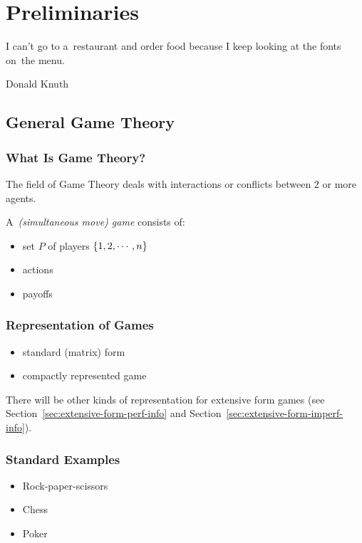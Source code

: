 \chapter{Preliminaries}
\epigraph{
  I can't go to a~restaurant and order food because I keep looking at the fonts on~the menu.
}{Donald Knuth}

\section{General Game Theory}

\subsection{What Is Game Theory?}

The field of Game Theory deals with interactions or conflicts between $2$ or more agents.
\todo

A~\emph{(simultaneous move) game} consists of: \todo
\begin{itemize}
  \item set $P$ of players $\left\{ 1, 2, \cdots, n \right\}$
  \item actions
  \item payoffs
\end{itemize}

\subsection{Representation of Games}

\todo
\begin{itemize}
  \item standard (matrix) form
  \item compactly represented game
\end{itemize}

There will be other kinds of representation for extensive form games (see Section~\ref{sec:extensive-form-perf-info} and Section~\ref{sec:extensive-form-imperf-info}).

\subsection{Standard Examples}

\todo %

\begin{itemize}
  \item{Rock-paper-scissors}
  \item{Chess}
  \item{Poker}
\end{itemize}

